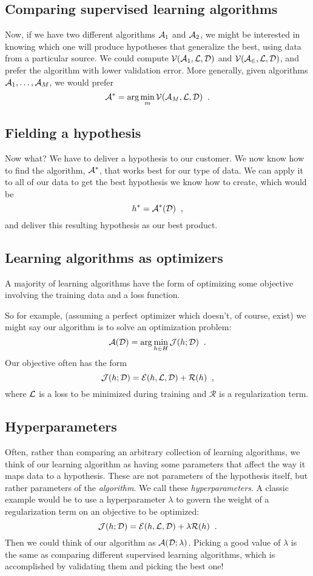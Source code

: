 \subsection{Comparing supervised learning algorithms}
Now, if we have two different algorithms $\mathcal{A}_1$  and
$\mathcal{A}_2$, we might be interested in knowing which one will
produce hypotheses that generalize the best, using data from a
particular source.   We could compute
$\mathcal{V}(\mathcal{A}_1, \mathcal{L}, {\cal D})$ and
$\mathcal{V}(\mathcal{A_2}, \mathcal{L}, {\cal D})$, and prefer the
algorithm with lower validation error.  More generally, given
algorithms $\mathcal{A}_1, \ldots, \mathcal{A}_M$, we would prefer
\[\mathcal{A}^* = {\rm arg}\min_{m} \mathcal{V}(\mathcal{A}_M, \mathcal{L}, {\cal D})\;\;.\]

\subsection{Fielding a hypothesis}

Now what?  We have to deliver a hypothesis to our customer.
We now know how to find the algorithm, $\mathcal{A}^*$, that works best for
our type of data.  We can apply it to all of our data to get the best
hypothesis we know how to create, which would be
\[h^* = \mathcal{A}^*({\cal D})\;\;,\]
and deliver this resulting hypothesis as our best product.

\subsection{Learning algorithms as optimizers}
A majority of learning algorithms have the form of
optimizing some objective involving the training data and a loss
function.  

So for example, (assuming a perfect optimizer which doesn't, of
course, exist) we might say our algorithm is to solve an optimization
problem:
\[\mathcal{A}({\cal D}) = {\rm arg}\min_{h \in H} \mathcal{J}(h; {\cal D})\;\;.\]
Our objective often has the form
\[\mathcal{J}(h; {\cal D}) = \mathcal{E}(h,\mathcal{L}, {\cal D}) +
  \mathcal{R}(h)\;\;,\]
where $\mathcal{L}$ is a loss to be minimized during training and
$\mathcal{R}$ is a regularization term.

\subsection{Hyperparameters}
Often, rather than comparing an arbitrary collection of learning algorithms,
we think of our learning algorithm as having some parameters that
affect the way it maps data to a hypothesis.  These are not
parameters of the hypothesis itself, but rather parameters of the
  {\em algorithm}.  We call these {\em hyperparameters}.  A classic
example would be to use a hyperparameter $\lambda$ to govern the weight of a
regularization term on an objective to be optimized:
\[\mathcal{J}(h; {\cal D}) = \mathcal{E}(h,\mathcal{L}, {\cal D}) +
  \lambda \mathcal{R}(h)\;\;.\]
Then we could think of our algorithm as $\mathcal{A}({\cal D};
  \lambda)$.
Picking a good value of $\lambda$ is the same as comparing different
supervised learning algorithms, which is accomplished by validating
them and picking the best one!

